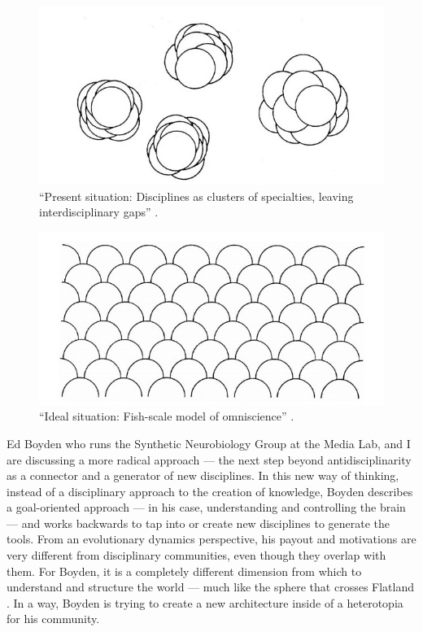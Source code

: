 \begin{figure}[h]
 \centering
\includegraphics[width=1\textwidth]{pictures/fishscale1.jpg}
 \caption{``Present situation: Disciplines as clusters of specialties, leaving interdisciplinary gaps'' \cite{campbell1969ethnocentrism}.}
 \label{fig:fishscale1}
\end{figure}

\begin{figure}[h]
 \centering
 \includegraphics[width=1\textwidth]{pictures/fishscale2.jpg}
 \caption{``Ideal situation: Fish-scale model of omniscience'' \cite{campbell1969ethnocentrism}.}
 \label{fig:fishscale2}
\end{figure}

Ed Boyden who runs the Synthetic Neurobiology Group at the Media Lab,  and I are discussing a more radical approach --- the next step beyond antidisciplinarity as a connector and a generator of new disciplines. In this new way of thinking, instead of a disciplinary approach to the creation of knowledge, Boyden describes a goal-oriented approach --- in his case, understanding and controlling the brain --- and works backwards to tap into or create new disciplines to generate the tools. From an evolutionary dynamics perspective, his payout and motivations are very different from disciplinary communities, even though they overlap with them. For Boyden, it is a completely different dimension from which to understand and structure the world --- much like the sphere that crosses Flatland \cite{abbott1884flatland}. In a way, Boyden is trying to create a new architecture inside of a heterotopia for his community.

